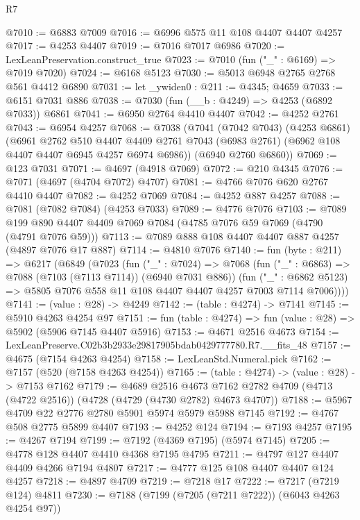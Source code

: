 \begin{lexlean}{R7}
\begin{coremodule}
@7010 := @6883 @7009
@7016 := @6996 @575 @11 @108 @4407 @4407 @4257
@7017 := @4253 @4407
@7019 := @7016 @7017 @6986
@7020 := LexLeanPreservation.construct_true
@7023 := @7010 (fun ("_" : @6169) => @7019 @7020)
@7024 := @6168 @5123
@7030 := @5013 @6948 @2765 @2768 @561 @4412 @6890
@7031 := let _ywiden0 : @211 := @4345; @4659
@7033 := @6151 @7031 @886
@7038 := @7030 (fun (__b : @4249) => @4253 (@6892 @7033)) @6861
@7041 := @6950 @2764 @4410 @4407
@7042 := @4252 @2761
@7043 := @6954 @4257
@7068 := @7038
    (@7041
      (@7042 @7043)
      (@4253 @6861)
      (@6961
        @2762
        @510
        @4407
        @4409
        @2761
        @7043
        (@6983 @2761)
        (@6962 @108 @4407 @4407 @6945 @4257 @6974 @6986))
      (@6940 @2760 @6860))
@7069 := @123 @7031
@7071 := @4697 (@4918 @7069)
@7072 := @210 @4345
@7076 := @7071 (@4697 (@4704 @7072) @4707)
@7081 := @4766 @7076 @620 @2767 @4410 @4407
@7082 := @4252 @7069
@7084 := @4252 @887 @4257
@7088 := @7081 (@7082 @7084) (@4253 @7033)
@7089 := @4776 @7076
@7103 := @7089 @199 @890 @4407 @4409 @7069 @7084 (@4785 @7076 @59 @7069 (@4790 (@4791 @7076 @59)))
@7113 := @7089 @888 @108 @4407 @4407 @887 @4257 (@4897 @7076 @17 @887)
@7114 := @4810 @7076
@7140 := fun (byte : @211) =>
  @6217
    (@6849
      (@7023
        (fun ("_" : @7024) =>
        @7068
          (fun ("_" : @6863) => @7088 (@7103 (@7113 @7114)) (@6940 @7031 @886))
          (fun ("_" : @6862 @5123) =>
          @5805 @7076 @558 @11 @108 @4407 @4407 @4257 @7003 @7114 @7006))))
@7141 := (value : @28) -> @4249
@7142 := (table : @4274) -> @7141
@7145 := @5910 @4263 @4254 @97
@7151 := fun (table : @4274) => fun (value : @28) => @5902 (@5906 @7145 @4407 @5916)
@7153 := @4671 @2516 @4673
@7154 := LexLeanPreserve.C02b3b2933e29817905bdab0429777780.R7.__fits_48
@7157 := @4675 (@7154 @4263 @4254)
@7158 := LexLeanStd.Numeral.pick
@7162 := @7157 (@520 (@7158 @4263 @4254))
@7165 := (table : @4274) -> (value : @28) -> @7153 @7162
@7179 := @4689
    @2516
    @4673
    @7162
    @2782
    @4709
    (@4713 (@4722 @2516))
    (@4728 (@4729 (@4730 @2782) @4673 @4707))
@7188 := @5967 @4709 @22 @2776 @2780 @5901 @5974 @5979 @5988 @7145
@7192 := @4767 @508 @2775 @5899 @4407
@7193 := @4252 @124
@7194 := @7193 @4257
@7195 := @4267 @7194
@7199 := @7192 (@4369 @7195) (@5974 @7145)
@7205 := @4778 @128 @4407 @4410 @4368 @7195 @4795
@7211 := @4797 @127 @4407 @4409 @4266 @7194 @4807
@7217 := @4777 @125 @108 @4407 @4407 @124 @4257
@7218 := @4897 @4709
@7219 := @7218 @17
@7222 := @7217 (@7219 @124) @4811
@7230 := @7188 (@7199 (@7205 (@7211 @7222)) (@6043 @4263 @4254 @97))

\end{coremodule}
\end{lexlean}
